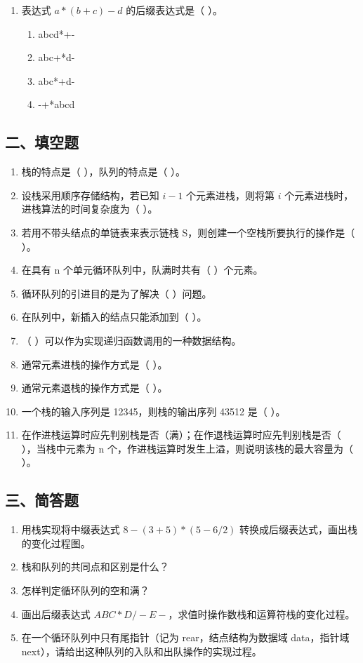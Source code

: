 \documentclass[12pt, a4paper]{article}
\begin{document}
\begin{enumerate}
    \item 表达式 $a*(b+c)-d$ 的后缀表达式是（ ）。
    \begin{enumerate}
        \item[A.] abcd*+-
        \item[B.] abc+*d-
        \item[C.] abc*+d-
        \item[D.] -+*abcd
    \end{enumerate}
\end{enumerate}

\subsection*{二、填空题}
\begin{enumerate}
    \item 栈的特点是（ ），队列的特点是（ ）。
    \item 设栈采用顺序存储结构，若已知 $i-1$ 个元素进栈，则将第 $i$ 个元素进栈时，进栈算法的时间复杂度为（ ）。
    \item 若用不带头结点的单链表来表示链栈 S，则创建一个空栈所要执行的操作是（ ）。
    \item 在具有 n 个单元循环队列中，队满时共有（ ）个元素。
    \item 循环队列的引进目的是为了解决（ ）问题。
    \item 在队列中，新插入的结点只能添加到（ ）。
    \item （ ）可以作为实现递归函数调用的一种数据结构。
    \item 通常元素进栈的操作方式是（ ）。
    \item 通常元素退栈的操作方式是（ ）。
    \item 一个栈的输入序列是 12345，则栈的输出序列 43512 是（ ）。
    \item 在作进栈运算时应先判别栈是否（满）；在作退栈运算时应先判别栈是否（ ），当栈中元素为 n 个，作进栈运算时发生上溢，则说明该栈的最大容量为（ ）。
\end{enumerate}

\subsection*{三、简答题}
\begin{enumerate}
    \item 用栈实现将中缀表达式 $8-(3+5)*(5-6/2)$ 转换成后缀表达式，画出栈的变化过程图。
    \item 栈和队列的共同点和区别是什么？
    \item 怎样判定循环队列的空和满？
    \item 画出后缀表达式 $ABC*D/-E-$，求值时操作数栈和运算符栈的变化过程。
    \item 在一个循环队列中只有尾指针（记为 rear，结点结构为数据域 data，指针域 next），请给出这种队列的入队和出队操作的实现过程。
\end{enumerate}
\end{document}
